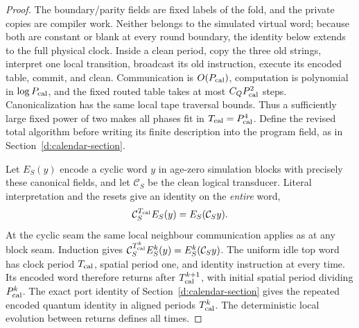 \begin{proof}
The boundary/parity fields are fixed labels of the fold, and the
private copies are compiler work. Neither belongs to the simulated
virtual word; because both are constant or blank at every round boundary,
the identity below extends to the full physical clock. Inside a clean period, copy the three old strings, interpret one local
transition, broadcast its old instruction, execute its encoded table,
commit, and clean. Communication is \(O(P_{\rm cal})\), computation is polynomial
in \(\log P_{\rm cal}\), and the fixed routed table takes at most \(C_QP_{\rm cal}^2\)
steps. Canonicalization has the same local tape traversal bounds.
Thus a sufficiently large fixed power of two makes all phases fit in
\(T_{\rm cal}=P_{\rm cal}^4\). Define the revised total algorithm before writing its finite
description into the program field, as in Section~\ref{d:calendar-section}.

Let \(E_S(y)\) encode a cyclic word \(y\) in age-zero simulation
blocks with precisely these canonical fields, and let \(\mathcal C_S\)
be the clean logical transducer. Literal interpretation and the resets
give an identity on the \emph{entire} word,
\[
 \mathcal C_S^{T_{\rm cal}} E_S(y)=E_S(\mathcal C_S y).
\]
At the cyclic seam the same local neighbour communication applies as at
any block seam. Induction gives
\(\mathcal C_S^{T_{\rm cal}^k}E_S^k(y)=E_S^k(\mathcal C_Sy)\).
The uniform idle top word has clock period \(T_{\rm cal}\), spatial period one,
and identity instruction at every time. Its encoded word therefore
returns after \(T_{\rm cal}^{k+1}\), with initial spatial period dividing \(P_{\rm cal}^k\).
The exact port identity of Section~\ref{d:calendar-section} gives the
repeated encoded quantum identity in aligned periods \(T_{\rm cal}^k\).
The deterministic local evolution between returns defines all times.
\end{proof}

